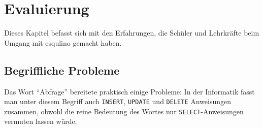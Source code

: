 \section{Evaluierung}

Dieses Kapitel befasst sich mit den Erfahrungen, die Schüler und Lehrkräfte beim Umgang mit esqulino gemacht haben.

\subsection{Begriffliche Probleme}

Das Wort "`Abfrage"' bereitete praktisch einige Probleme: In der Informatik fasst man unter diesem Begriff auch \texttt{INSERT}, \texttt{UPDATE} und \texttt{DELETE} Anweisungen zusammen, obwohl die reine Bedeutung des Wortes nur \texttt{SELECT}-Anweisungen vermuten lassen würde.


